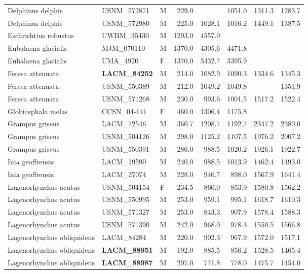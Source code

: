 \begin{table}[ht]
\begin{tabular}{lllrrrrr}
  Delphinus delphis & USNM\_572871 & M & 229.0 &  & 1051.0 & 1311.3 & 1283.7 \\ 
  Delphinus delphis & USNM\_572980 & M & 225.0 & 1028.1 & 1016.2 & 1449.1 & 1387.5 \\ 
  Eschrichtius robustus & UWBM\_35430 & M & 1293.0 & 4557.0 &  &  &  \\ 
  Eubalaena glacialis & MJM\_070110 & M & 1370.0 & 4305.6 & 4471.8 &  &  \\ 
  Eubalaena glacialis & UMA\_4920 & F & 1370.0 & 3432.7 & 3395.9 &  &  \\ 
  Feresa attenuata & \textbf{ LACM\_84252 } & M & 214.0 & 1082.9 & 1090.3 & 1334.6 & 1345.3 \\ 
  Feresa attenuata & USNM\_550389 & M & 212.0 & 1049.2 & 1049.8 &  & 1351.9 \\ 
  Feresa attenuata & USNM\_571268 & M & 230.0 & 993.6 & 1001.5 & 1517.2 & 1522.4 \\ 
  Globicephala melas & CCSN\_04-141 & F & 460.0 & 1306.4 & 1175.8 &  &  \\ 
  Grampus griseus & LACM\_72546 & M & 360.7 & 1208.7 & 1192.7 & 2347.2 & 2380.0 \\ 
  Grampus griseus & USNM\_504126 & M & 298.0 & 1125.2 & 1107.5 & 1976.2 & 2007.2 \\ 
  Grampus griseus & USNM\_550391 & M & 286.0 & 988.5 & 1020.2 & 1926.1 & 1922.7 \\ 
  Inia geoffrensis & LACM\_19590 & M & 240.0 & 988.5 & 1013.9 & 1462.4 & 1493.0 \\ 
  Inia geoffrensis & LACM\_27074 & M & 228.0 & 940.7 & 898.0 & 1567.9 & 1641.4 \\ 
  Lagenorhynchus acutus & USNM\_504154 & F & 234.5 & 860.0 & 853.9 & 1580.8 & 1562.2 \\ 
  Lagenorhynchus acutus & USNM\_550995 & M & 253.0 & 959.1 & 995.1 & 1618.7 & 1610.3 \\ 
  Lagenorhynchus acutus & USNM\_571327 & M & 253.0 & 843.3 & 907.9 & 1578.4 & 1588.3 \\ 
  Lagenorhynchus acutus & USNM\_571390 & M & 242.0 & 968.0 & 978.3 & 1550.5 & 1566.8 \\ 
  Lagenorhynchus obliquidens & LACM\_84284 & M & 220.0 & 902.3 & 967.9 & 1572.0 & 1517.1 \\ 
  Lagenorhynchus obliquidens & \textbf{ LACM\_88951 } & M & 192.0 & 885.5 & 856.2 & 1528.5 & 1465.4 \\ 
  Lagenorhynchus obliquidens & \textbf{ LACM\_88987 } & M & 207.0 & 771.8 & 778.0 & 1475.7 & 1454.0 \\ 

\end{tabular}
\end{table}
